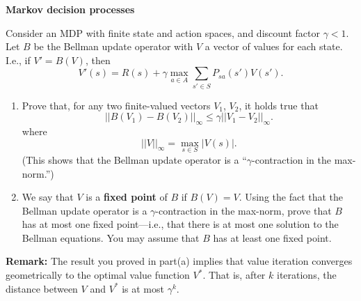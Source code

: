 \clearpage
\item {} {\bf Markov decision processes}

Consider an MDP with finite state and action spaces, and discount
factor $\gamma < 1$.  Let $B$ be the Bellman update operator with
$V$ a vector of values for each state. I.e., if $V' = B(V)$, then
\[
V'(s) = R(s) + \gamma \max_{a\in A} \sum_{s'\in S} P_{sa}(s')
V(s').
\]

\begin{enumerate}
\item {} Prove that, for any two finite-valued vectors $V_1$, 
$V_2$, it
holds true that
\[
   ||B(V_1) - B(V_2)||_\infty \leq \gamma ||V_1 - V_2||_\infty.
\]
where
\[
   ||V||_\infty = \max_{s \in S} |V(s)|.
\]
(This shows that the Bellman update operator is a
``$\gamma$-contraction in the max-norm.'')

\item {} We say that $V$ is a {\bf fixed point} of $B$ if
$B(V) = V$. Using the fact that the Bellman update operator is a
$\gamma$-contraction in the max-norm, prove that $B$ has at most
one fixed point---i.e., that there is at most one solution to the
Bellman equations.  You may assume that $B$ has at least one fixed
point.

\end{enumerate}

\textbf{Remark:} The result you proved in part(a) implies that value iteration converges geometrically to the optimal value function $V^*$. That is, after $k$ iterations, the distance between $V$ and $V^*$ is at most $\gamma^k$.

